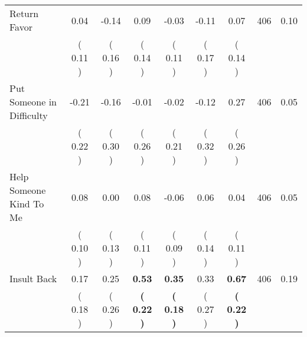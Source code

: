 \begin{tabular}{lcccccccc}
Return Favor &      0.04 &     -0.14 &      0.09 &     -0.03 &     -0.11 &      0.07 & 406 &       0.10 \\ 
 & (     0.11 ) & (     0.16 ) & (     0.14 ) & (     0.11 ) & (     0.17 ) & (     0.14 ) & \\
Put Someone in Difficulty &     -0.21 &     -0.16 &     -0.01 &     -0.02 &     -0.12 &      0.27 & 406 &       0.05 \\ 
 & (     0.22 ) & (     0.30 ) & (     0.26 ) & (     0.21 ) & (     0.32 ) & (     0.26 ) & \\
Help Someone Kind To Me &      0.08 &      0.00 &      0.08 &     -0.06 &      0.06 &      0.04 & 406 &       0.05 \\ 
 & (     0.10 ) & (     0.13 ) & (     0.11 ) & (     0.09 ) & (     0.14 ) & (     0.11 ) & \\
Insult Back &      0.17 &      0.25 & \textbf{     0.53} & \textbf{     0.35} &      0.33 & \textbf{     0.67} & 406 &       0.19 \\ 
 & (     0.18 ) & (     0.26 ) & \textbf{(     0.22 )} & \textbf{(     0.18 )} & (     0.27 ) & \textbf{(     0.22 )} & \\
\bottomrule
\end{tabular}
